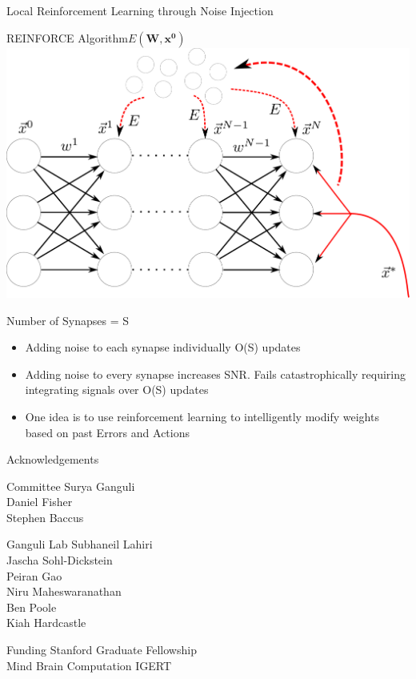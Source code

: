 \documentclass[pdf]{beamer}
\newcommand{\avg}[1]{\mbox{$\left\langle \, #1 \, \right\rangle$}}
\begin{document}
\begin{frame}[t]{Local Reinforcement Learning through Noise Injection}

\begin{center}

REINFORCE Algorithm\quad \quad \quad \quad \quad $E(\mathbf{W},\mathbf{x^0})$\\

\includegraphics[width = .40\textwidth]{fwdError.pdf}

\end{center}

Number of Synapses = S
\vspace{.1in}
\begin{itemize}
\item Adding noise to each synapse individually O(S) updates
\item Adding noise to every synapse increases SNR. Fails catastrophically requiring integrating signals over O(S) updates
\item One idea is to use reinforcement learning to intelligently modify weights based on past Errors and Actions
\end{itemize}
%
\end{frame}





\begin{frame}{Acknowledgements}

\begin{block}{Committee}
Surya Ganguli \\
Daniel Fisher \\
Stephen Baccus
\end{block}


\begin{block}{Ganguli Lab}
Subhaneil Lahiri\\
Jascha Sohl-Dickstein\\
Peiran Gao\\
Niru Maheswaranathan \\
Ben Poole \\
Kiah Hardcastle
\end{block}

\begin{block}{Funding}
Stanford Graduate Fellowship \\
Mind Brain Computation IGERT
\end{block}



\end{frame}
\end{document}

